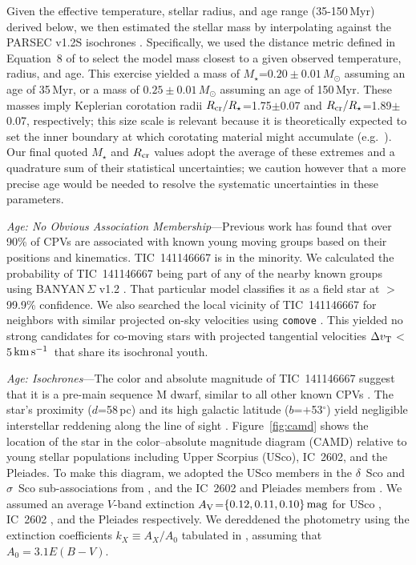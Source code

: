 \documentclass{nature3}
\newcommand{\kms}{\ensuremath{\rm km\,s^{-1}}}
\begin{document}
\begin{methods}
Given the effective temperature, stellar radius, and age range
(35-150\,Myr) derived below, we then estimated the stellar mass by
interpolating against the PARSEC v1.2S isochrones \cite{Chen2014}.
Specifically, we used the distance metric defined in Equation~8 of
\cite{Bouma2024} to select the model mass closest to a given observed
temperature, radius, and age.  This exercise yielded a mass of
$M_\star$=$0.20\pm0.01$\,$M_\odot$ assuming an age of 35\,Myr, or a mass
of $0.25\pm0.01$\,$M_\odot$ assuming an age of 150\,Myr.  These masses
imply Keplerian corotation radii $R_{\rm cr}/R_\star$=1.75$\pm$0.07 and
$R_{\rm cr}/R_\star$=1.89$\pm$0.07, respectively; this size scale is
relevant because it is theoretically expected to set the inner boundary
at which corotating material might accumulate
(e.g.~\cite{Townsend2005,Daley-Yates2024}).  Our final quoted $M_\star$
and $R_{\rm cr}$ values adopt the average of these extremes and a
quadrature sum of their statistical uncertainties; we caution however
that a more precise age would be needed to resolve the systematic
uncertainties in these parameters.


{\it Age: No Obvious Association Membership}---Previous work
\cite{Bouma2024} has found that over 90\% of CPVs are associated with
known young moving groups based on their positions and kinematics.
TIC~141146667 is in the minority.  We calculated the probability of
TIC~141146667 being part of any of the nearby known groups using
BANYAN\,$\Sigma$ v1.2 \cite{Gagne2018}.  That particular model
classifies it as a field star at $>$99.9\% confidence.  We also searched
the local vicinity of TIC~141146667 for neighbors with similar projected
on-sky velocities using \texttt{comove} \cite{Tofflemire2021}.  This
yielded no strong candidates for co-moving stars with projected
tangential velocities $\Delta v_{\rm T}$$<$5\,\kms\ that share its
isochronal youth.

{\it Age: Isochrones}---The color and absolute magnitude of
TIC~141146667 suggest that it is a pre-main sequence M dwarf, similar to
all other known CPVs \cite{Stauffer2017,Stauffer2021,Bouma2024}.  The
star's proximity ($d$=58\,pc) and its high galactic latitude
($b$=$+$53$^\circ$) yield negligible interstellar reddening along the
line of sight \cite{Green2019}.  Figure~\ref{fig:camd} shows the
location of the star in the color--absolute magnitude diagram (CAMD)
relative to young stellar populations including Upper Scorpius (USco),
IC~2602, and the Pleiades.  To make this diagram, we adopted the USco
members in the $\delta$~Sco and $\sigma$~Sco sub-associations from
\cite{Ratzenbock2023}, and the IC~2602 and Pleiades members from
\cite{Hunt2024}.  We assumed an average $V$-band extinction $A_{\rm
V}$=$\{0.12, 0.11, 0.10\}\,{\rm mag}$ for USco \cite{Pecaut2016},
IC~2602 \cite{Hunt2024}, and the Pleiades \cite{Hunt2024} respectively.
We dereddened the photometry using the extinction coefficients
$k_X\equiv A_X/A_0$ tabulated in \cite{GaiaCollaboration2018}, assuming
that $A_0 = 3.1 E(B-V)$.


\end{methods}
\end{document}
